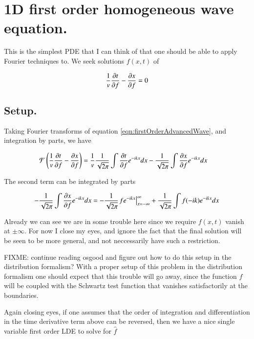 \documentclass{article}
\newcommand{\FF}[0]{\mathcal{F}}
\begin{document}
\section{ 1D first order homogeneous wave equation. }

This is the simplest PDE that I can think of that one should be able 
to apply Fourier techniques to.  We seek solutions $f(x,t)$ of

\begin{align}\label{eqn:firstOrderAdvancedWave}
\frac{1}{v} \frac{\partial{t}}{\partial {f}} - \frac{\partial{x}}{\partial {f}} = 0
\end{align}

\subsection{ Setup. }

Taking Fourier transforms of equation \ref{eqn:firstOrderAdvancedWave}, and integration
by parts, we have

\begin{align*}
\FF\left(\inv{v} \PD{t}{f} - \PD{x}{f} \right) &=
\inv{v} \inv{\sqrt{2\pi}} \int \PD{t}{f} e^{-i k x} dx - \inv{\sqrt{2\pi}} \int \PD{x}{f} e^{-i k x } dx
\end{align*}

The second term can be integrated by parts

\begin{align*}
- \frac{1}{\sqrt{2\pi}} \int \frac{\partial{x}}{\partial {f}} e^{-i k x } dx
=
- \frac{1}{\sqrt{2\pi}} {\left. {f} e^{-i k x } \right\vert}_{x = -\infty}^{\infty}
+ \frac{1}{\sqrt{2\pi}} \int {f} (-i k ) e^{-i k x } dx
\end{align*}

Already we can see we are in some trouble here since we require 
$f(x,t)$ vanish at $\pm \infty$.
For now I close my eyes, and ignore the fact that the final solution will be seen to be more 
general, and not neccessarily have such a restriction.

FIXME: continue reading osgood and figure out how to do this setup in the distribution formalism?
With a proper setup of this problem in the distribution formalism one should expect that this trouble will
go away, since the function $f$ will be coupled with the Schwartz test function
that vanishes satisfactorily at the boundaries.

Again closing eyes, if one assumes that the order of integration and
differentiation in the time 
derivative term above can be reversed, then
we have a nice single variable first order LDE to solve for $\hat{f}$
\end{document}
